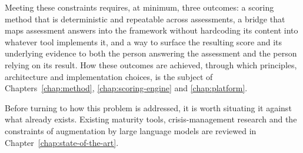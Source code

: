Meeting these constraints requires, at minimum, three outcomes: a scoring
method that is deterministic and repeatable across assessments, a bridge
that maps assessment answers into the framework without hardcoding its
content into whatever tool implements it, and a way to surface the
resulting score and its underlying evidence to both the person answering
the assessment and the person relying on its result. How these outcomes are
achieved, through which principles, architecture and implementation
choices, is the subject of Chapters~\ref{chap:method}, \ref{chap:scoring-engine} and
\ref{chap:platform}.

Before turning to how this problem is addressed, it is worth situating it
against what already exists. Existing maturity tools, crisis-management
research and the constraints of augmentation by large language models are reviewed in
Chapter~\ref{chap:state-of-the-art}.